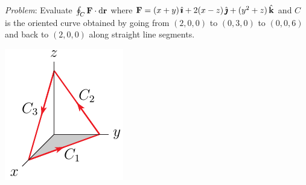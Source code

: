 \begin{eg}\label{eg:stokesB}
\noindent\textit{Problem}:
Evaluate
$
\oint_C\mathbf{F}\cdot\mathrm{d}\mathbf{r}
$
where $\mathbf{F}= (x+y)\,\hat{\pmb{\imath}}+2(x-z)\,\hat{\pmb{\jmath}} +(y^2+z)\,\hat{\mathbf{k}}$ 
and $C$ is the oriented curve  obtained by 
going from $(2,0,0)$ to $(0, 3, 0)$ to $(0, 0, 6)$ and back to 
$(2, 0, 0)$ along straight line segments. 

\begin{nfig}
\begin{center}
    \includegraphics{domainTriangle.pdf}
\end{center}
\end{nfig}



\end{eg}
